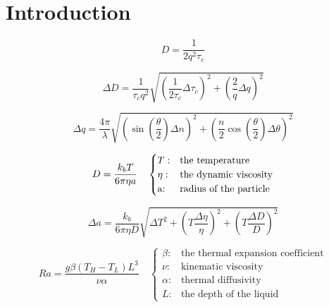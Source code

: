 \section{Introduction}

\begin{equation}
    D = \frac{1}{2q^2 \tau_c}
    \label{disp_eq}
\end{equation}

\begin{equation}
    \Delta D = \frac{1}{\tau_c q^2}\sqrt{\left(\frac{1}{2\tau_c}\Delta \tau_c\right)^2 + \left(\frac{2}{q}\Delta q\right)^2}
    \label{disp_uncertainty}
\end{equation}

\begin{equation}
    \Delta q = \frac{4\pi}{\lambda} \sqrt{\left(\sin\left(\frac{\theta}{2}\right) \Delta n\right)^2 + \left(\frac{n}{2}\cos\left(\frac{\theta}{2}\right) \Delta \theta\right)^2}
    \label{q_uncertainty}
\end{equation}

\begin{equation}
    D = \frac{k_b T}{6\pi \eta a} \quad \begin{cases}
        T: & \text{the temperature} \\
        \eta: & \text{the dynamic viscosity}\\
        $a$:& \text{radius of the particle}
    \end{cases}
    \label{stokes_einstein}
\end{equation}

\begin{equation}
    \Delta a = \frac{k_b}{6\pi\eta D}\sqrt{\Delta T^2 + \left(T \frac{\Delta \eta}{\eta}\right)^2 + \left(T \frac{\Delta D}{D}\right)^2}
    \label{stokes_einstein_uncertainty}
\end{equation}

\begin{equation}
    Ra = \frac{g \beta (T_H -T_L)L^3}{\nu\alpha} \quad 
    \begin{cases}
        \beta:& \text{the thermal expansion coefficient}\\
        \nu : & \text{kinematic viscosity}\\
        \alpha :& \text{thermal diffusivity}\\
        L : & \text{the depth of the liquid}
    \end{cases}
    \label{rayleigh_number}
\end{equation}

